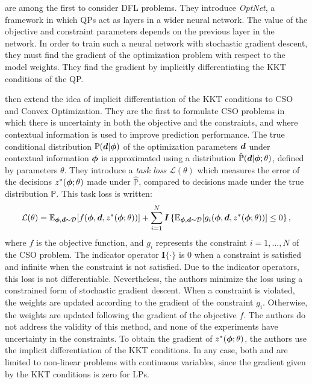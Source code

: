 \cite{amosOptNetDifferentiableOptimization2021} are among the first to consider DFL problems. They introduce \textit{OptNet}, a framework in which QPs act as layers in a wider neural network. The value of the objective and constraint parameters depends on the previous layer in the network. In order to train such a neural network with stochastic gradient descent, they must find the gradient of the optimization problem with respect to the model weights. They find the gradient by implicitly differentiating the KKT conditions of the QP. 

\cite{dontiTaskbasedEndtoendModel2017} then extend the idea of implicit differentiation of the KKT conditions to CSO and Convex Optimization. They are the first to formulate CSO problems in which there is uncertainty in both the objective and the constraints, and where contextual information is used to improve prediction performance. The true conditional distribution $\mathbb{P}({\bm{d}} | {\bm{\phi}})$ of the optimization parameters ${\bm{d}}$ under contextual information ${\bm{\phi}}$ is approximated using a distribution $\mathbb{\hat{P}}({\bm{d}} |{\bm{\phi}} ; \theta)$, defined by parameters $\theta$. They introduce a \textit{task loss} $\mathcal{L}(\theta)$ which measures the error of the decisions $z^*({\bm{\phi}} ; \theta)$ made under $\mathbb{\hat{P}}$, compared to decisions made under the true distribution $\mathbb{P}$. This task loss is written:
\begin{equation}\label{eq:litrev:task-loss-constraints}
    \mathcal{L}(\theta) = \mathbb{E}_{{\bm{\phi}}, {\bm{d}} \sim \mathcal{D}}[f({\bm{\phi}}, {\bm{d}}, z^*({\bm{\phi}} ; \theta))] + \sum_{i=1}^{N} \bm{I}\left\{\mathbb{E}_{{\bm{\phi}}, {\bm{d}} \sim \mathcal{D}}[g_i({\bm{\phi}}, {\bm{d}}, z^*({\bm{\phi}} ; \theta))] \leq  0\right\},
\end{equation}
where $f$ is the objective function, and $g_i$ represents the constraint $i = 1, \ldots, N$ of the CSO problem. The indicator operator $\bm{I}\{\cdot\}$ is 0 when a constraint is satisfied and infinite when the constraint is not satisfied. Due to the indicator operators, this loss is not differentiable. Nevertheless, the authors minimize the loss using a constrained form of stochastic gradient descent. When a constraint is violated, the weights are updated according to the gradient of the constraint $g_i$. Otherwise, the weights are updated following the gradient of the objective $f$. The authors do not address the validity of this method, and none of the experiments have uncertainty in the constraints. To obtain the gradient of $z^*({\bm{\phi}};\theta)$, the authors use the implicit differentiation of the KKT conditions. In any case, both \cite{amosOptNetDifferentiableOptimization2021} and \cite{dontiTaskbasedEndtoendModel2017} are limited to non-linear problems with continuous variables, since the gradient given by the KKT conditions is zero for LPs. 

